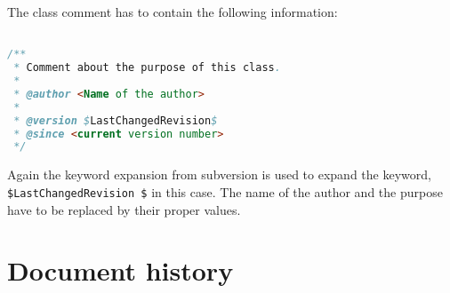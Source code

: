 \documentclass[11pt,a4paper]{article}
\begin{document}
The class comment has to contain the following information:

\begin{lstlisting}[language=Java]

/**
 * Comment about the purpose of this class.
 *
 * @author <Name of the author>
 *
 * @version $LastChangedRevision$
 * @since <current version number>
 */
\end{lstlisting}

Again the keyword expansion from subversion is used to expand the keyword,
\texttt{\$LastChangedRevision \$} in this case. The name of the author and the 
purpose have to be replaced by their proper values.

\section*{Document history}
\end{document}
